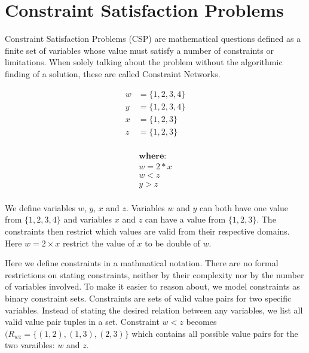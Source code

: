 \chapter{Constraint Satisfaction Problems}

Constraint Satisfaction Problems (CSP) are mathematical questions defined as a finite set of variables whose value must satisfy a number of constraints or limitations. When solely talking about the problem without the algorithmic finding of a solution, these are called Constraint Networks.

\begin{tcolorbox}[title=Example:]
	\begin{multicols}{2}
		\begin{equation*}
			\begin{aligned}
				w & = \{1, 2, 3, 4\} \\
				y & = \{1, 2, 3, 4\} \\
				x & = \{1, 2, 3\}    \\
				z & = \{1, 2, 3\}    \\
			\end{aligned}
		\end{equation*}

		\columnbreak

		\noindent
		\begin{equation*}
			\begin{aligned}
				\textbf{where:} \\
				w = 2*x         \\
				w < z           \\
				y > z           \\
			\end{aligned}
		\end{equation*}
	\end{multicols}
\end{tcolorbox}

We define variables $w$, $y$, $x$ and $z$. Variables $w$ and $y$ can both have one value from $\{1, 2, 3, 4\}$ and variables $x$ and $z$ can have a value from $\{1, 2, 3\}$. The constraints then restrict which values are valid from their respective domains. Here $w = 2 \times x$ restrict the value of $x$ to be double of $w$.

Here we define constraints in a mathmatical notation. There are no formal restrictions on stating constraints, neither by their complexity nor by the number of variables involved. To make it easier to reason about, we model constraints as binary constraint sets. Constraints are sets of valid value pairs for two specific variables. Instead of stating the desired relation between any variables, we list all valid value pair tuples in a set. Constraint $w < z$ becomes $(R_{wz} = \{(1, 2), (1, 3), (2, 3)\}$ which contains all possible value pairs for the two varaibles: $w$ and $z$.

